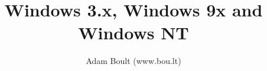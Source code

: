 \documentclass[oneside]{book}
\begin{document}
\author{Adam Boult (www.bou.lt)}
\title{Windows 3.x, Windows 9x and Windows NT}
\maketitle

\setcounter{tocdepth}{0}
\tableofcontents


\end{document}
